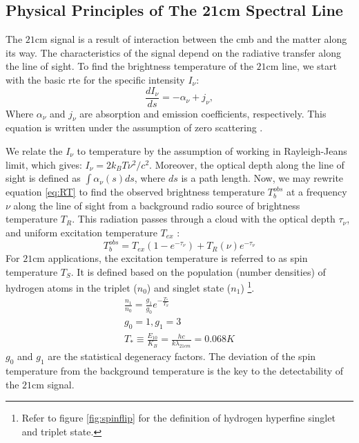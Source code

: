 \documentclass[12pt, TexShade, letterpaper]{report}
\begin{document}
\subsection{Physical Principles of The 21cm Spectral Line}
The $\mathrm{21cm}$ signal is a result of interaction between the \gls{cmb} and the matter along its way. The characteristics of the signal depend on the radiative transfer along the line of sight. To find the brightness temperature of the $\mathrm{21cm}$ line, we start with the basic \gls{rte} for the specific intensity $I_{\nu}$:
\begin{equation}
    \frac{dI_\nu}{ds} = - \alpha_\nu + j_\nu ,
    \label{eq:RT}
\end{equation}
Where $\alpha_\nu$ and $j_\nu$ are absorption and emission coefficients, respectively. This equation is written under the assumption of zero scattering \cite{21century, low_frequency}. \par
We relate the $I_\nu$ to temperature by the assumption of working in Rayleigh-Jeans limit, which gives: $I_\nu = 2k_B T \nu^2 /c^2$. Moreover, the optical depth along the line of sight is defined as $\int \alpha_\nu \left(s\right) ds$, where $ds$ is a path length. Now, we may rewrite equation \ref{eq:RT} to find the observed brightness temperature $T^{obs}_b$ at a frequency $\nu$ along the line of sight from a background radio source of brightness temperature $T_R$. This radiation passes through a cloud with the optical depth $\tau_\nu$, and uniform excitation temperature $T_{ex}$ \cite{21century, low_frequency}:
\begin{equation}
    T^{obs}_b = T_{ex} \left(1-e^{-\tau_\nu} \right) + T_R \left (\nu \right) e ^{-\tau_\nu} \label{eq:excitation_T}
\end{equation}
For $\mathrm{21cm}$ applications, the excitation temperature is referred to as spin temperature $T_S$. It is defined based on the population (number densities) of hydrogen atoms in the triplet ($n_0$) and singlet state ($n_1$) \cite{21century, low_frequency} \footnote{Refer to figure \ref{fig:spinflip} for the definition of hydrogen hyperfine singlet and triplet state.}.
\begin{gather}
    \frac{n_1}{n_0} = \frac{g_1}{g_0} e ^ {-\frac{T_*}{T_S}}\\
    g_0 =1, g_1 =3\\
     T_* \equiv \frac{E_{10}}{K_B} = \frac {hc}{k\lambda_{21cm}} = 0.068 K
\end{gather}
$g_0$ and $g_1$ are the statistical degeneracy factors. The deviation of the spin temperature from the background temperature is the key to the detectability of the $\mathrm{21cm}$ signal.\par
\end{document}
